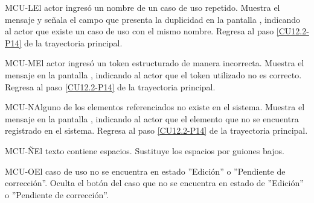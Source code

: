 	\begin{UCtrayectoriaA}{MCU-L}{El actor ingresó un nombre de un caso de uso repetido.}
		\UCpaso[\UCsist] Muestra el mensaje  y señala el campo que presenta la duplicidad en la pantalla , indicando al actor que existe un caso de uso con el mismo nombre.
		\UCpaso Regresa al paso \ref{CU12.2-P14} de la trayectoria principal.
	\end{UCtrayectoriaA}

	\begin{UCtrayectoriaA}{MCU-M}{El actor ingresó un token estructurado de manera incorrecta.}
		\UCpaso[\UCsist] Muestra el mensaje  en la pantalla , indicando al actor que el token utilizado no es correcto.
		\UCpaso Regresa al paso \ref{CU12.2-P14} de la trayectoria principal.
	\end{UCtrayectoriaA}

	\begin{UCtrayectoriaA}{MCU-N}{Alguno de los elementos referenciados no existe en el sistema.}
		\UCpaso[\UCsist] Muestra el mensaje  en la pantalla , indicando al actor que el elemento que no se encuentra registrado en el sistema.
		\UCpaso Regresa al paso \ref{CU12.2-P14} de la trayectoria principal.
	\end{UCtrayectoriaA}

	\begin{UCtrayectoriaA}{MCU-Ñ}{El texto contiene espacios.}
		\UCpaso[\UCsist] Sustituye los espacios por guiones bajos.
	\end{UCtrayectoriaA}

	\begin{UCtrayectoriaA}{MCU-O}{El caso de uso no se encuentra en estado ''Edición'' o ''Pendiente de corrección''.}
		\UCpaso[\UCsist] Oculta el botón \editar del caso que no se encuentra en estado de ''Edición'' o ''Pendiente de corrección''.
	\end{UCtrayectoriaA}

